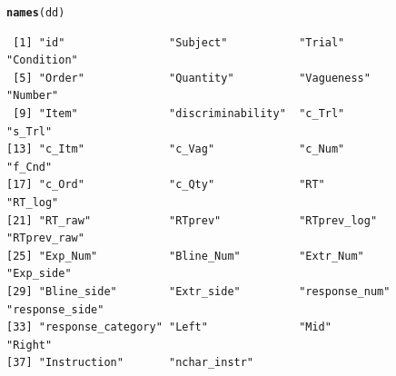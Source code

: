 \documentclass[a4paper,12pt,twoside]{article}\usepackage[]{graphicx}\usepackage[]{color}
\makeatletter
\newcommand{\hlstd}[1]{\textcolor[rgb]{0.345,0.345,0.345}{#1}}%
\newcommand{\hlkwd}[1]{\textcolor[rgb]{0.737,0.353,0.396}{\textbf{#1}}}%
\newenvironment{kframe}{%
 \def\at@end@of@kframe{}%
 \ifinner\ifhmode%
  \def\at@end@of@kframe{\end{minipage}}%
  \begin{minipage}{\columnwidth}%
 \fi\fi%
 \def\FrameCommand##1{\hskip\@totalleftmargin \hskip-\fboxsep
 \colorbox{shadecolor}{##1}\hskip-\fboxsep
     \hskip-\linewidth \hskip-\@totalleftmargin \hskip\columnwidth}%
 \MakeFramed {\advance\hsize-\width
   \@totalleftmargin\z@ \linewidth\hsize
   \@setminipage}}%
 {\par\unskip\endMakeFramed%
 \at@end@of@kframe}
\newenvironment{knitrout}{}{} %
\makeatother
\begin{document}
\begin{knitrout}\scriptsize
{}\color{fgcolor}\begin{kframe}
\begin{alltt}
\hlkwd{names}\hlstd{(dd)}
\end{alltt}
\begin{verbatim}
 [1] "id"                "Subject"           "Trial"             "Condition"        
 [5] "Order"             "Quantity"          "Vagueness"         "Number"           
 [9] "Item"              "discriminability"  "c_Trl"             "s_Trl"            
[13] "c_Itm"             "c_Vag"             "c_Num"             "f_Cnd"            
[17] "c_Ord"             "c_Qty"             "RT"                "RT_log"           
[21] "RT_raw"            "RTprev"            "RTprev_log"        "RTprev_raw"       
[25] "Exp_Num"           "Bline_Num"         "Extr_Num"          "Exp_side"         
[29] "Bline_side"        "Extr_side"         "response_num"      "response_side"    
[33] "response_category" "Left"              "Mid"               "Right"            
[37] "Instruction"       "nchar_instr"      
\end{verbatim}
\end{kframe}
\end{knitrout}

\clearpage
\end{document}
